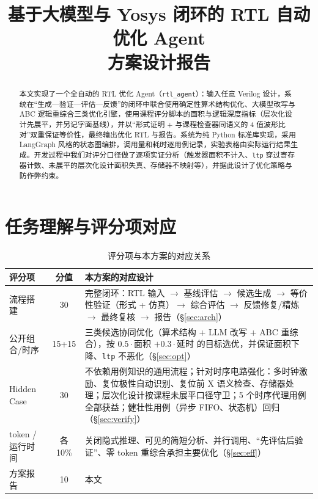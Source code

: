 \documentclass[UTF8,a4paper,zihao=5]{ctexart}
\title{\textbf{基于大模型与 Yosys 闭环的 RTL 自动优化 Agent}\\[4pt]\large 方案设计报告}
\author{}
\date{}
\newcommand{\code}[1]{\texttt{#1}}
\begin{document}
\maketitle
\vspace{-2.5em}

\begin{abstract}
本文实现了一个全自动的 RTL 优化 Agent（\code{rtl\_agent}）：输入任意 Verilog 设计，系统在“生成—验证—评估—反馈”的闭环中联合使用确定性算术结构优化、大模型改写与 ABC 逻辑重综合三类优化引擎，使用课程评分脚本的面积与逻辑深度指标（层次化设计先展平，并另记字面基线），并以“形式证明 + 与课程检查器同语义的 4 值波形比对”双重保证等价性，最终输出优化 RTL 与报告。系统为纯 Python 标准库实现，采用 LangGraph 风格的状态图编排，调用量和耗时逐用例记录，实验表格由实际运行结果生成。开发过程中我们对评分口径做了逐项实证分析（触发器面积不计入、\code{ltp} 穿过寄存器计数、未展平的层次化设计面积失真、存储器不映射等），并据此设计了优化策略与防作弊约束。
\end{abstract}

\section{任务理解与评分项对应}

\begin{table}[h]\centering\small
\caption{评分项与本方案的对应关系}
\begin{tabularx}{\linewidth}{@{}l c X@{}}
\toprule
评分项 & 分值 & 本方案的对应设计 \\
\midrule
流程搭建 & 30 & 完整闭环：RTL 输入 $\rightarrow$ 基线评估 $\rightarrow$ 候选生成 $\rightarrow$ 等价性验证（形式 + 仿真）$\rightarrow$ 综合评估 $\rightarrow$ 反馈修复/精炼 $\rightarrow$ 最终复核 $\rightarrow$ 报告（\S\ref{sec:arch}） \\
公开组合/时序 & 15+15 & 三类候选协同优化（算术结构 + LLM 改写 + ABC 重综合），按 $0.5\cdot$面积 $+0.3\cdot$延时 的目标选优，并保证面积下降、\code{ltp} 不恶化（\S\ref{sec:opt}） \\
Hidden Case & 30 & 不依赖用例知识的通用流程；针对时序电路强化：多时钟激励、复位极性自动识别、复位前 X 语义检查、存储器处理；层次化设计按课程未展平口径守卫；5 个时序代理用例全部获益；健壮性用例（异步 FIFO、状态机）回归（\S\ref{sec:verify}） \\
token / 运行时间 & 各 10\% & 关闭隐式推理、可见的简短分析、并行调用、“先评估后验证”、零 token 重综合承担主要优化（\S\ref{sec:eff}） \\
方案报告 & 10 & 本文 \\
\bottomrule
\end{tabularx}
\end{table}
\end{document}

